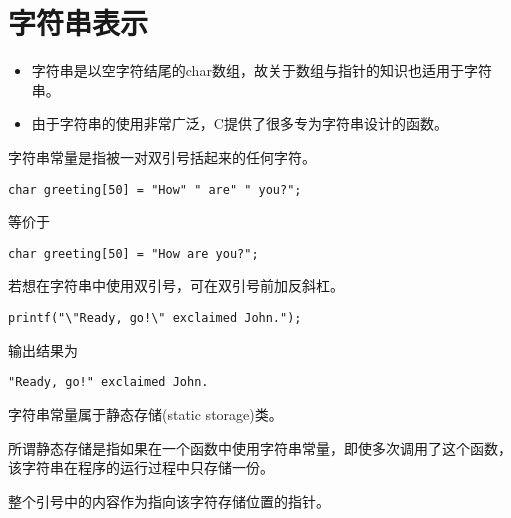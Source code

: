\section{字符串表示}

\begin{frame}[fragile]\ft{\secname}
\begin{itemize}
\item
字符串是以空字符结尾的char数组，故关于数组与指针的知识也适用于字符串。
\\[0.15in]
\item
由于字符串的使用非常广泛，C提供了很多专为字符串设计的函数。
\end{itemize}
\end{frame}

\begin{frame}[fragile]

字符串常量是指被一对双引号括起来的任何字符。\vspace{0.1in}

\begin{lstlisting}[basicstyle=\ttfamily,showstringspaces=true]
char greeting[50] = "How" " are" " you?";
\end{lstlisting}
等价于
\begin{lstlisting}[basicstyle=\ttfamily,showstringspaces=true]
char greeting[50] = "How are you?";
\end{lstlisting}
\end{frame}

\begin{frame}[fragile]
若想在字符串中使用双引号，可在双引号前加反斜杠。\vspace{0.1in}

\begin{lstlisting}[basicstyle=\ttfamily,showstringspaces=true]
printf("\"Ready, go!\" exclaimed John.");
\end{lstlisting}\vspace{0.1in}

输出结果为
\begin{lstlisting}[basicstyle=\ttfamily,showstringspaces=true]
"Ready, go!" exclaimed John.
\end{lstlisting}
\end{frame}

\begin{frame}[fragile]
字符串常量属于静态存储(static storage)类。\vspace{0.1in}

\textcolor{acolor1}{所谓静态存储是指如果在一个函数中使用字符串常量，即使多次调用了这个函数，该字符串在程序的运行过程中只存储一份。}\vspace{0.1in}

整个引号中的内容作为指向该字符存储位置的指针。
\end{frame}

